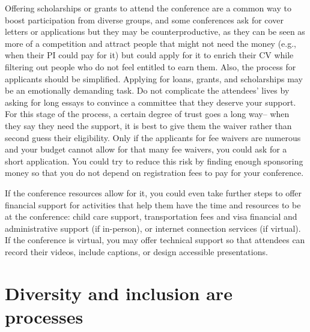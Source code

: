 \documentclass[10pt,letterpaper]{article}
\begin{document}
Offering scholarships or grants to attend the conference are a common way to boost participation from diverse groups, and some conferences ask for cover letters or applications  but they may be counterproductive, as they can be seen as more of a competition and attract people that might not need the money (e.g., when their PI could pay for it) but could apply for it to enrich their CV while filtering out people who do not feel entitled to earn them. 
Also, the process for applicants should be simplified. Applying for loans, grants, and scholarships may be an emotionally demanding task. Do not complicate the attendees' lives by asking for long essays to convince a committee that they deserve your support. For this stage of the process, a certain degree of trust goes a long way-- when they say they need the support, it is best to give them the waiver rather than second guess their eligibility. 
Only if the applicants for fee waivers are numerous and your budget cannot allow for that many fee waivers, you could ask for a short application. You could try to reduce this risk by finding enough sponsoring money so that you do not depend on registration fees to pay for your conference.

If the conference resources allow for it, you could even take further steps to offer financial support for activities that help them have the time and resources to be at the conference: child care support, transportation fees and visa financial and administrative support (if in-person), or internet connection services (if virtual). If the conference is virtual, you may offer technical support so that attendees can record their videos, include captions, or design accessible presentations.



\section{Diversity and inclusion are processes}
\label{rule_process}
\end{document}
